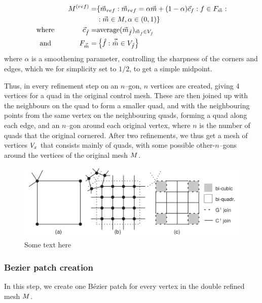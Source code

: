 \begin{align}
\petersControlMesh^{(ref)} =& \lbrace \petersControlMeshVec_{ref} \suchthat\petersControlMeshVec_{ref} = \alpha\petersControlMeshVec + (1-\alpha)\centroidof{f} \suchthat f \in \facesof{\petersControlMeshVec} \suchthat
\\ \notag &
 \suchthat \petersControlMeshVec \in \petersControlMesh, \alpha \in (0,1) \rbrace
\\
\where \qquad\qquad \centroidof{\hat{f}} =& \text{average}(\petersControlMeshVec_{\hat{f}})_{\petersControlMeshVec_{\hat{f}} \in \verticesof{\hat{f}}}
\\
\text{and} \qquad\qquad F_{\vec{\hat{m}}} =& \left\lbrace \hat{f} \suchthat \vec{\hat{m}} \in \verticesof{\hat{f}}	\right\rbrace
\end{align}
where $\alpha$ is a smoothening parameter, controlling the sharpness of the corners and edges, which we for simplicity set to $1/2$, to get a simple midpoint.

Thus, in every refinement step on an $n$--gon, $n$ vertices are created, giving 4 vertices for a quad in the original control mesh. These are then joined up with the neighbours on the quad to form a smaller quad, and with the neighbouring points from the same vertex on the neighbouring quads, forming a quad along each edge, and an $n$--gon around each original vertex, where $n$ is the number of quads that the original cornered. After two refinements, we thus get a mesh of vertices $\petersPatchPoints$ that consists mainly of quads, with some possible other-$n$--gons around the vertices of the original mesh $\petersControlMesh$. 

\begin{figure}
	\centering
	\includegraphics[width = \textwidth]{Pictures/NURBS/petersQuad_to_patches.png}
	\caption{Some text here}
	\label{fig:petersSubDivide}
\end{figure}

\subsubsection{Bezier patch creation}
In this step, we create one B{\'e}zier patch for every vertex in the double refined mesh $\petersControlMesh$. 

